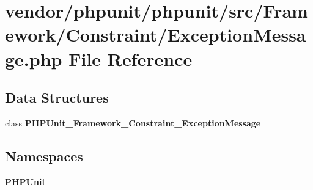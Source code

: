 \section{vendor/phpunit/phpunit/src/\+Framework/\+Constraint/\+Exception\+Message.php File Reference}
\label{_exception_message_8php}
\subsection*{Data Structures}
\begin{DoxyCompactItemize}
\item 
class {\bf P\+H\+P\+Unit\+\_\+\+Framework\+\_\+\+Constraint\+\_\+\+Exception\+Message}
\end{DoxyCompactItemize}
\subsection*{Namespaces}
\begin{DoxyCompactItemize}
\item 
 {\bf P\+H\+P\+Unit}
\end{DoxyCompactItemize}
